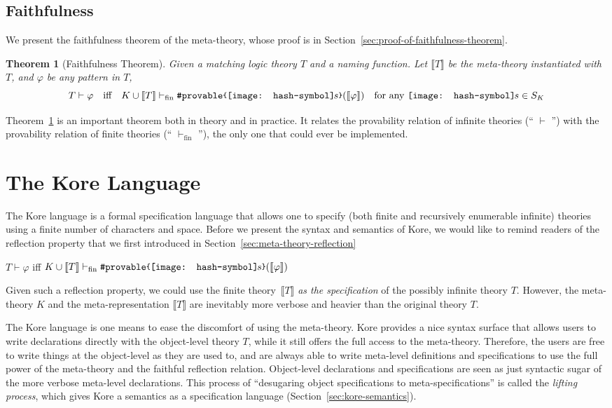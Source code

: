 \documentclass[UTF8,11pt]{article}
\newcounter{thmcounter}
\theoremstyle{plain}
\newtheorem{theorem}    [thmcounter]{Theorem}
\theoremstyle{definition}
\theoremstyle{remark}
\newcommand{\vdashfin}{\vdash_\text{fin}}
\newcommand{\parametric}[2]{{#1}\raisebox{.2ex}{\texttt{\footnotesize{\{}}}#2\raisebox{.2ex}{\texttt{\footnotesize{\}}}}}
\newcommand{\denote}[1]{\llbracket{#1}\rrbracket}
\newcommand{\shp}{\texttt{[image: hash-symbol]}\kern-0.1em}
\newcommand{\sharpsymbol}{\#}
\newcommand{\shs}{\shp s}
\newcommand{\Kdeduce}{\textup{\texttt{\sharpsymbol provable}}}
\begin{document}
\subsection{Faithfulness}
We present the faithfulness theorem of the meta-theory, whose proof is in 
Section~\ref{sec:proof-of-faithfulness-theorem}. 
\begin{theorem}[Faithfulness Theorem]\label{thm:faithfulness-finite}
	Given a matching logic theory $T$ and a naming function.
	Let $\denote{T}$ be the meta-theory instantiated with $T$, and $\varphi$ be 
	any pattern in $T$,
	$$T \vdash \varphi \quad \text{iff} \quad K \cup \denote{T} \vdashfin 
	\parametric{\Kdeduce}{\shs}(\denote{\varphi})\quad\text{for any $\shs \in 
	S_K$}$$
\end{theorem}

Theorem~\ref{thm:faithfulness-finite} is an important theorem both in theory 
and in practice.
It relates the provability relation of infinite theories (`` $\vdash$ '') with 
the provability relation of finite theories (`` $\vdashfin$ ''), the only one
that could ever be implemented.

\section{The Kore Language}
\label{sec:kore}

The Kore language is a formal specification language that allows one to specify 
(both finite and recursively enumerable infinite) theories using a finite 
number of characters and space.
Before we present the syntax and semantics of Kore, we would like to remind 
readers of the reflection property that we first introduced 
in Section~\ref{sec:meta-theory-reflection}
\begin{center}
$T \vdash \varphi$ \quad iff \quad 
$K \cup \denote{T} \vdashfin 
		\parametric{\Kdeduce}{\shs}(\denote{\varphi})$
\end{center}

Given such a reflection property, 
we could use the finite theory~$\denote{T}$ \emph{as the specification} of the 
possibly infinite theory $T$.
However, the meta-theory $K$ and the meta-representation $\denote{T}$ are 
inevitably more verbose and heavier than the original theory $T$.

The Kore language is one means to ease the discomfort of using the meta-theory.
Kore provides a nice syntax surface that allows users to write declarations 
directly with the object-level theory $T$, while it still offers the full 
access to the meta-theory.
Therefore, the users are free to write things at the object-level as they are 
used to, and are always able to write meta-level definitions and specifications 
to use the full power of the meta-theory and the faithful reflection relation.
Object-level declarations and specifications are seen as just syntactic sugar 
of the more verbose meta-level declarations.
This process of ``desugaring object specifications to meta-specifications'' is 
called the \emph{lifting process}, which gives Kore a semantics as a 
specification 
language (Section~\ref{sec:kore-semantics}).
\end{document}
